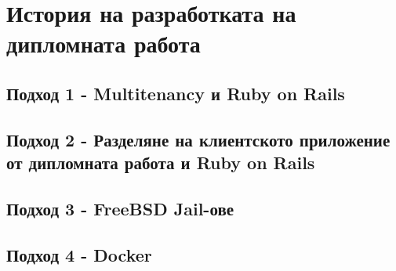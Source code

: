 \documentclass[pdftex,12pt,a4paper]{report}
\begin{document}
\section {История на разработката на дипломната работа}
\subsection {Подход 1 - Multitenancy и Ruby on Rails}
\subsection {Подход 2 - Разделяне на клиентското приложение от дипломната работа и Ruby on Rails}
\subsection {Подход 3 - FreeBSD Jail-ове}
\subsection {Подход 4 - Docker}
%
%
\end{document}
